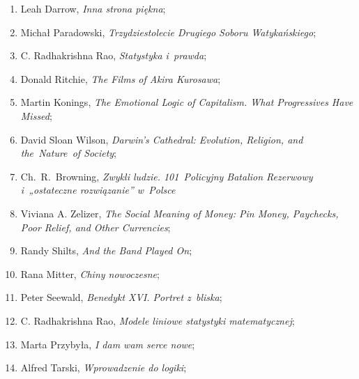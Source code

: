\documentclass[a4paper,11pt]{article}
\begin{document}
\begin{enumerate}
\item Leah Darrow, \textit{Inna strona piękna};



\item Michał Paradowski, \textit{Trzydziestolecie Drugiego Soboru
    Watykańskiego};



\item C. Radhakrishna Rao, \textit{Statystyka i~prawda};



\item Donald Ritchie, \textit{The Films of Akira Kurosawa};



\item Martin Konings, \textit{The Emotional Logic of Capitalism. What
    Progressives Have Missed};



\item David Sloan Wilson, \textit{Darwin's Cathedral: Evolution,
    Religion, and the~Nature~of Society};



\item Ch.~R.~Browning, \textit{Zwykli ludzie. 101~Policyjny Batalion
    Rezerwowy i~„ostateczne rozwiązanie” w~Polsce}



\item Viviana A. Zelizer, \textit{The Social Meaning of Money: Pin
    Money, Paychecks, Poor Relief, and Other Currencies};



\item Randy Shilts, \textit{And the Band Played On};



\item Rana Mitter, \textit{Chiny nowoczesne};



\item Peter Seewald, \textit{Benedykt XVI. Portret z~bliska};



\item C. Radhakrishna Rao, \textit{Modele liniowe statystyki matematycznej};



\item Marta Przybyła, \textit{I dam wam serce nowe};



\item Alfred Tarski, \textit{Wprowadzenie do logiki};




\end{enumerate}
\end{document}
